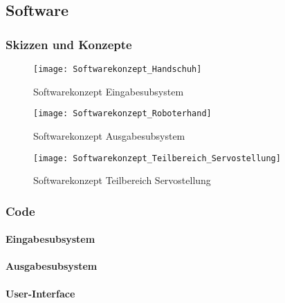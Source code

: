 \documentclass[titlepage,12pt,twoside]{article}
\begin{document}
\subsection{Software}
\label{chap:Fertigungsunterlagen_Software}
\subsubsection{Skizzen und Konzepte}
\begin{figure}[H]
	\begin{center}
		\scalebox{0.6}
		{\texttt{[image: Softwarekonzept\_Handschuh]}}
		\caption{Softwarekonzept Eingabesubsystem}
		\label{fig:Softwarekonzept_Handschuh}		
	\end{center}
\end{figure}
\hfill \break
\begin{figure}[H]
	\begin{center}
		\scalebox{0.6}
		{\texttt{[image: Softwarekonzept\_Roboterhand]}}
		\caption{Softwarekonzept Ausgabesubsystem}
		\label{fig:Softwarekonzept_Roboterhand}		
	\end{center}
\end{figure}
\hfill \break
\begin{figure}[H]
	\begin{center}
		\scalebox{0.6}
		{\texttt{[image: Softwarekonzept\_Teilbereich\_Servostellung]}}
		\caption{Softwarekonzept Teilbereich Servostellung}
		\label{fig:Softwarekonzept_Teilbereich_Servostellung}		
	\end{center}
\end{figure}
\hfill \break

\subsubsection{Code}
\label{chap:Fertigungsunterlagen_Software_Code}
\paragraph{Eingabesubsystem}

\paragraph{Ausgabesubsystem}

\paragraph{User-Interface}

\newpage
\listoffigures

\newpage

\listoftables

\newpage

\printbibliography

\newpage
\end{document}
